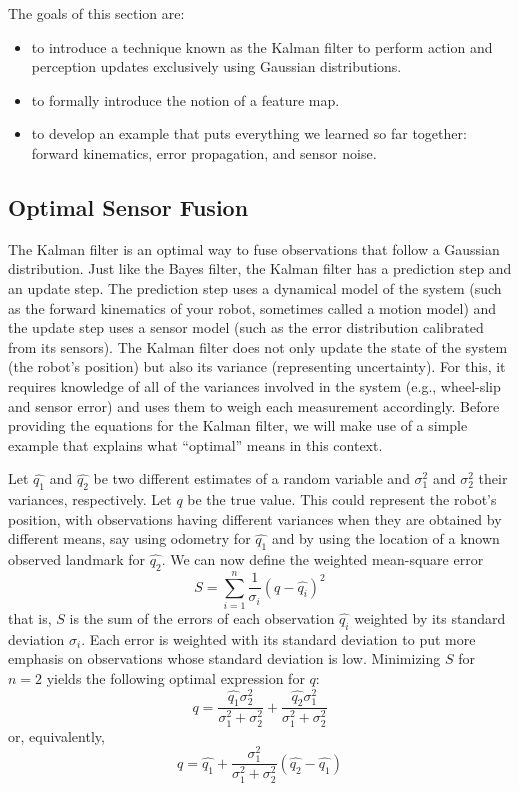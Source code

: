 The goals of this section are:

\begin{itemize}
\item to introduce a technique known as the Kalman filter to perform action and perception updates exclusively using Gaussian distributions.
\item to formally introduce the notion of a feature map.
\item to develop an example that puts everything we learned so far together: forward kinematics, error propagation, and sensor noise.
\end{itemize}

\subsection{Optimal Sensor Fusion}
The Kalman filter is an optimal way to fuse observations that follow a Gaussian distribution. Just like the Bayes filter, the Kalman filter has a prediction step and an update step. The prediction step uses a dynamical model of the system (such as the forward kinematics of your robot, sometimes called a motion model) and the update step uses a sensor model (such as the error distribution calibrated from its sensors). The Kalman filter does not only update the state of the system (the robot's position) but also its variance (representing uncertainty). For this, it requires knowledge of all of the variances involved in the system (e.g., wheel-slip and sensor error) and uses them to weigh each measurement accordingly. Before providing the equations for the Kalman filter, we will make use of a simple example that explains what ``optimal'' means in this context.

 Let $ \hat{q_1}$ and $ \hat{q_2}$ be two different estimates of a random variable and $ \sigma^2_1$ and $ \sigma^2_2$ their variances, respectively. Let $ q$ be the true value. This could represent the robot's position, with observations having different variances when they are obtained by different means, say using odometry for $ \hat{q_1}$ and by using the location of a known observed landmark for $ \hat{q_2}$. We can now define the weighted mean-square error
 \begin{equation}
S=\displaystyle\sum_{i=1}^{n}\frac{1}{\sigma_i} (q-\hat{q_i})^2
\end{equation}
that is, $ S$ is the sum of the errors of each observation $ \hat{q_i}$ weighted by its standard deviation $ \sigma_i$. Each error is weighted  with its standard deviation to put more emphasis on observations whose standard deviation is low. Minimizing  $S$ for $n=2$ yields the following optimal expression for $q$:
\begin{equation}
q=\frac{\hat{q_1}\sigma_2^2}{\sigma_1^2+\sigma_2^2}+\frac{\hat{q_2}\sigma_1^2}{\sigma_1^2+\sigma_2^2}
\end{equation}
or, equivalently,
\begin{equation}
q=\hat{q_1}+\frac{\sigma_1^2}{\sigma_1^2+\sigma_2^2}(\hat{q_2}-\hat{q_1})\label{eq:optimalfusion}
\end{equation}

